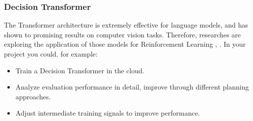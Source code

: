 \documentclass[a4paper]{article}
\begin{document}




\subsubsection{Decision Transformer}
The Transformer architecture is extremely effective for language models, and has shown to promising results on computer vision tasks.
Therefore, researches are exploring the application of those models for Reinforcement Learning \citet{DecisionTransformer2021}, \citet{Kuang-Huei2022}. In your project you could, for example:
\begin{itemize}
  \item Train a Decision Transformer in the cloud.
  \item Analyze evaluation performance in detail, improve through different planning approaches.
  \item Adjust intermediate training signals to improve performance.
\end{itemize}
\end{document}
